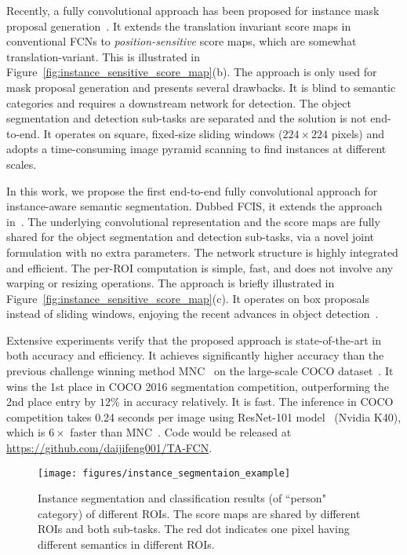 \documentclass[10pt,twocolumn,letterpaper]{article}
\begin{document}
Recently, a fully convolutional approach has been proposed for instance mask proposal generation~\cite{dai2016instance}. It extends the translation invariant score maps in conventional FCNs to \emph{position-sensitive} score maps, which are somewhat translation-variant. This is illustrated in Figure~\ref{fig:instance_sensitive_score_map}(b). The approach is only used for mask proposal generation and presents several drawbacks. It is blind to semantic categories and requires a downstream network for detection. The object segmentation and detection sub-tasks are separated and the solution is not end-to-end. It operates on square, fixed-size sliding windows ($224 \times 224$ pixels) and adopts a time-consuming image pyramid scanning to find instances at different scales.

In this work, we propose the first end-to-end fully convolutional approach for instance-aware semantic segmentation. Dubbed FCIS, it extends the approach in~\cite{dai2016instance}. The underlying convolutional representation and the score maps are fully shared for the object segmentation and detection sub-tasks, via a novel joint formulation with no extra parameters. The network structure is highly integrated and efficient. The per-ROI computation is simple, fast, and does not involve any warping or resizing operations. The approach is briefly illustrated in Figure~\ref{fig:instance_sensitive_score_map}(c). It operates on box proposals instead of sliding windows, enjoying the recent advances in object detection~\cite{ren2015faster}.

Extensive experiments verify that the proposed approach is state-of-the-art in both accuracy and efficiency. It achieves significantly higher accuracy than the previous challenge winning method MNC~\cite{dai2016mnc} on the large-scale COCO dataset~\cite{lin2014coco}. It wins the 1st place in COCO 2016 segmentation competition, outperforming the 2nd place entry by $12\%$ in accuracy relatively. It is fast. The inference in COCO competition takes 0.24 seconds per image using ResNet-101 model~\cite{he2016deep} (Nvidia K40), which is $6\times$ faster than MNC~\cite{dai2016mnc}. Code would be released at \url{https://github.com/daijifeng001/TA-FCN}.

\begin{figure*}
	\centering
	\texttt{[image: figures/instance\_segmentaion\_example]}
	\caption{Instance segmentation and classification results (of ``person" category) of different ROIs. The score maps are shared by different ROIs and both sub-tasks. The red dot indicates one pixel having different semantics in different ROIs.}
	\label{fig:instance_segmentaion_example}
\end{figure*}
\end{document}
